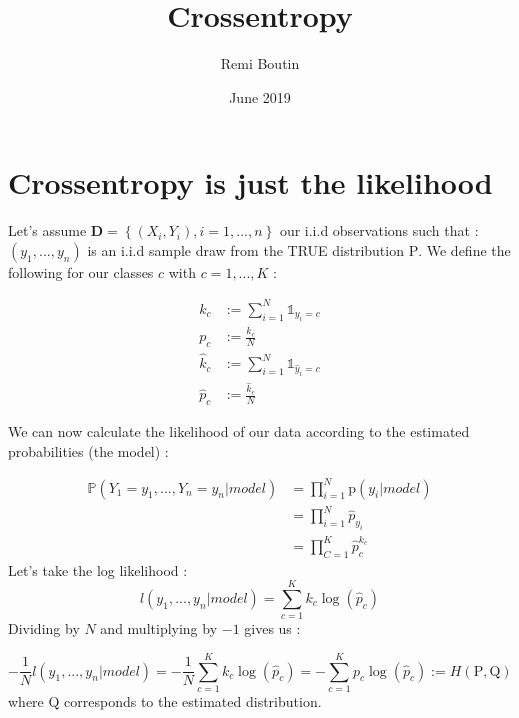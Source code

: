 \documentclass[11pt]{article}
\title{Crossentropy}
\author{Remi Boutin}
\date{June 2019}
\begin{document}
\maketitle

\section{Crossentropy is just the likelihood}

Let's assume $\mathbf{D} =  \left\{(X_i,Y_i), i=1,...,n \right\}$ our i.i.d observations such that :  
$ (y_1,...,y_n) $ is an i.i.d sample draw from the TRUE distribution $\mathrm{P}$. We define the following for our classes $c$ with $c=1,...,K$  :

\begin{equation}
\begin{split}
k_c & := \sum_{i=1}^{N} \mathbb{1}_{y_i=c}\\ 
p_c & := \frac{k_c}{N}\\
\hat{k}_c & := \sum_{i=1}^{N} \mathbb{1}_{\hat{y}_i=c}\\
\hat{p}_c & := \frac{\hat{k}_c}{N} 
\end{split}
\end{equation}

We can now calculate the likelihood of our data according to the estimated probabilities (the model) : 

\begin{equation}
\begin{split}
    \mathbb{P}( Y_1=y_1,...,Y_n=y_n | model) & = \prod_{i=1}^{N} \mathrm{p}( y_i | model)\\
    & =  \prod_{i=1}^{N}  \hat{p}_{y_i}\\
    & =  \prod_{C=1}^{K} \hat{p}_{c}^{k_c}
\end{split}
\end{equation}
Let's take the log likelihood :
\begin{equation}
    l(y_1,...,y_n| model) = \sum_{c=1}^{K} k_c \log(\hat{p}_{c})
\end{equation}
Dividing by $N$ and multiplying by $-1$ gives us : 

\begin{equation}
    - \frac{1}{N}l(y_1,...,y_n| model)  = - \frac{1}{N} \sum_{c=1}^{K} k_c \log(\hat{p}_{c})
     = - \sum_{c=1}^{K} p_c \log(\hat{p}_{c}) := H(\mathrm{P},\mathrm{Q})
\end{equation}
where $\mathrm{Q}$ corresponds to the estimated distribution.\baselineskip 
\end{document}

